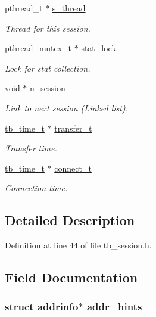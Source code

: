 \begin{DoxyCompactItemize}
pthread\-\_\-t $\ast$ \hyperlink{structtb__session__t_ae0b73c023bde38042a32ba345baca741}{s\-\_\-thread}
\begin{DoxyCompactList}\small\item\em Thread for this session. \end{DoxyCompactList}\item 
pthread\-\_\-mutex\-\_\-t $\ast$ \hyperlink{structtb__session__t_ab828bf6b1b85621025b518a892b79d79}{stat\-\_\-lock}
\begin{DoxyCompactList}\small\item\em Lock for stat collection. \end{DoxyCompactList}\item 
void $\ast$ \hyperlink{structtb__session__t_ae96f976543c2fbc18fd89a368720f4d4}{n\-\_\-session}
\begin{DoxyCompactList}\small\item\em Link to next session (Linked list). \end{DoxyCompactList}\item 
\hyperlink{structtb__time__t}{tb\-\_\-time\-\_\-t} $\ast$ \hyperlink{structtb__session__t_a0cb6fc264a37771e927fe0b383fc600c}{transfer\-\_\-t}
\begin{DoxyCompactList}\small\item\em Transfer time. \end{DoxyCompactList}\item 
\hyperlink{structtb__time__t}{tb\-\_\-time\-\_\-t} $\ast$ \hyperlink{structtb__session__t_a49678949e63fd3a8335bac2bfa9d9ff2}{connect\-\_\-t}
\begin{DoxyCompactList}\small\item\em Connection time. \end{DoxyCompactList}\end{DoxyCompactItemize}


\subsection{Detailed Description}


Definition at line 44 of file tb\-\_\-session.\-h.



\subsection{Field Documentation}
\hypertarget{structtb__session__t_a105521cb94384edeaace1a1ce7b3d7c7}{
\subsubsection[{addr\-\_\-hints}]{\setlength{\rightskip}{0pt plus 5cm}struct addrinfo$\ast$ addr\-\_\-hints}}\label{structtb__session__t_a105521cb94384edeaace1a1ce7b3d7c7}


